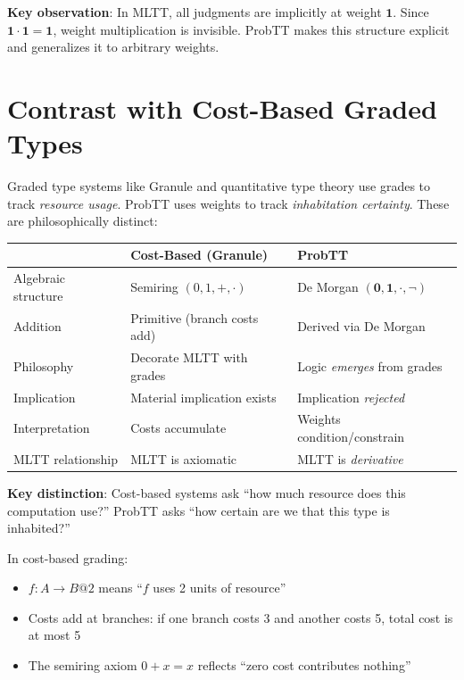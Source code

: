 \documentclass[11pt,a4paper]{article}
\newcommand{\one}{\mathbf{1}}
\newcommand{\zero}{\mathbf{0}}
\newcommand{\negw}{\neg}
\begin{document}
\textbf{Key observation}: In MLTT, all judgments are implicitly at weight $\one$. Since $\one \cdot \one = \one$, weight multiplication is invisible. ProbTT makes this structure explicit and generalizes it to arbitrary weights.

\section{Contrast with Cost-Based Graded Types}

Graded type systems like Granule \citep{orchard2019quantitative} and quantitative type theory \citep{atkey2018syntax} use grades to track \emph{resource usage}. ProbTT uses weights to track \emph{inhabitation certainty}. These are philosophically distinct:

\begin{center}
\begin{tabular}{l|l|l}
& \textbf{Cost-Based (Granule)} & \textbf{ProbTT} \\
\hline
Algebraic structure & Semiring $(0, 1, +, \cdot)$ & De Morgan $(\zero, \one, \cdot, \negw)$ \\
Addition & Primitive (branch costs add) & Derived via De Morgan \\
Philosophy & Decorate MLTT with grades & Logic \emph{emerges} from grades \\
Implication & Material implication exists & Implication \emph{rejected} \\
Interpretation & Costs accumulate & Weights condition/constrain \\
MLTT relationship & MLTT is axiomatic & MLTT is \emph{derivative} \\
\end{tabular}
\end{center}

\textbf{Key distinction}: Cost-based systems ask ``how much resource does this computation use?'' ProbTT asks ``how certain are we that this type is inhabited?''

In cost-based grading:
\begin{itemize}
    \item $f : A \to B @ 2$ means ``$f$ uses 2 units of resource''
    \item Costs add at branches: if one branch costs 3 and another costs 5, total cost is at most 5
    \item The semiring axiom $0 + x = x$ reflects ``zero cost contributes nothing''
\end{itemize}
\end{document}
